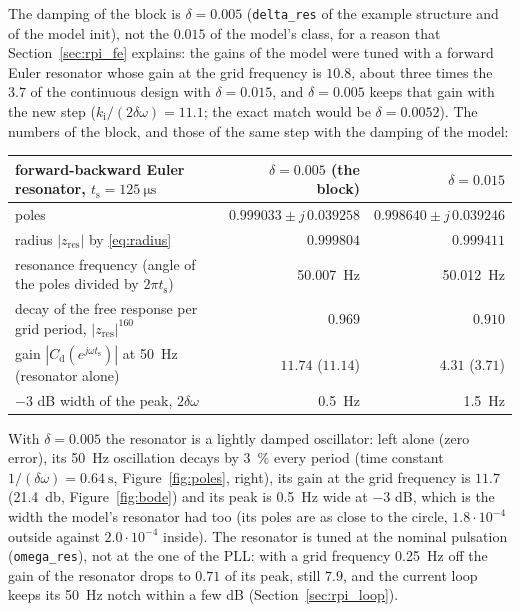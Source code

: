 \documentclass[11pt,a4paper]{scrartcl}
\newcommand{\ped}[1]{_{\mathrm{#1}}}
\newcommand{\code}[1]{\texttt{#1}}
\begin{document}
\begin{onehalfspace}
The damping of the block is $\delta = 0.005$ (\code{delta\_res} of the example structure and of the model init), not the $0.015$ of the model's class, for a reason that Section~\ref{sec:rpi_fe} explains: the gains of the model were tuned with a forward Euler resonator whose gain at the grid frequency is $10.8$, about three times the $3.7$ of the continuous design with $\delta = 0.015$, and $\delta = 0.005$ keeps that gain with the new step ($k\ped{i}/(2\delta\omega) = 11.1$; the exact match would be $\delta = 0.0052$). The numbers of the block, and those of the same step with the damping of the model:
\begin{center}
	\footnotesize
	\begin{tabular}{@{} l r r @{}}
		\toprule
		forward-backward Euler resonator, $t\ped{s} = \SI{125}{\micro\second}$ & $\delta = 0.005$ (the block) & $\delta = 0.015$ \\
		\midrule
		poles & $0.999033 \pm j\,0.039258$ & $0.998640 \pm j\,0.039246$ \\
		radius $|z\ped{res}|$ by \eqref{eq:radius} & $0.999804$ & $0.999411$ \\
		resonance frequency (angle of the poles divided by $2\pi t\ped{s}$) & \SI{50.007}{\hertz} & \SI{50.012}{\hertz} \\
		decay of the free response per grid period, $|z\ped{res}|^{160}$ & $0.969$ & $0.910$ \\
		gain $|C\ped{d}(e^{j\omega t\ped{s}})|$ at \SI{50}{\hertz} (resonator alone) & $11.74$ ($11.14$) & $4.31$ ($3.71$) \\
		$-3$ dB width of the peak, $2\delta\omega$ & \SI{0.5}{\hertz} & \SI{1.5}{\hertz} \\
		\bottomrule
	\end{tabular}
\end{center}
With $\delta = 0.005$ the resonator is a lightly damped oscillator: left alone (zero error), its \SI{50}{\hertz} oscillation decays by \SI{3}{\percent} every period (time constant $1/(\delta\omega) = \SI{0.64}{\second}$, Figure~\ref{fig:poles}, right), its gain at the grid frequency is $11.7$ (\SI{21.4}{\decibel}, Figure~\ref{fig:bode}) and its peak is \SI{0.5}{\hertz} wide at $-3$ dB, which is the width the model's resonator had too (its poles are as close to the circle, $1.8 \cdot 10^{-4}$ outside against $2.0 \cdot 10^{-4}$ inside). The resonator is tuned at the nominal pulsation (\code{omega\_res}), not at the one of the PLL: with a grid frequency \SI{0.25}{\hertz} off the gain of the resonator drops to $0.71$ of its peak, still $7.9$, and the current loop keeps its \SI{50}{\hertz} notch within a few dB (Section~\ref{sec:rpi_loop}).


\end{onehalfspace}
\end{document}
